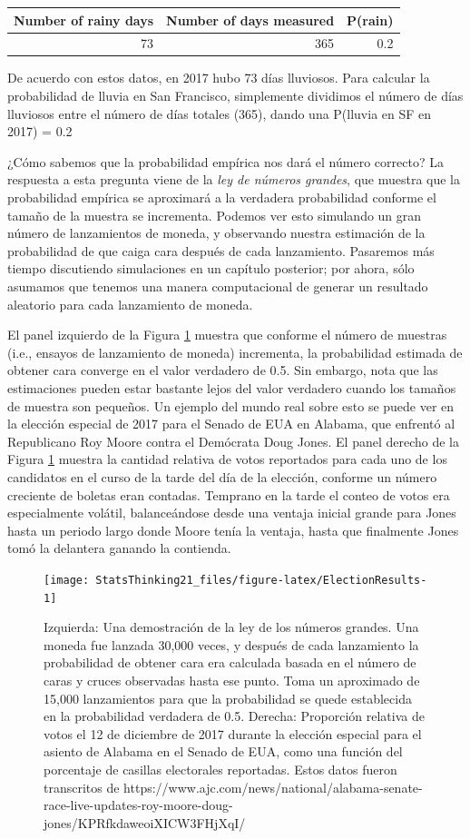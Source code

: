 \documentclass[
  12pt,
]{book}
\begin{document}
\begin{tabular}{r|r|r}
\hline
Number of rainy days & Number of days measured & P(rain)\\
\hline
73 & 365 & 0.2\\
\hline
\end{tabular}

De acuerdo con estos datos, en 2017 hubo 73 días lluviosos. Para calcular la probabilidad de lluvia en San Francisco, simplemente dividimos el número de días lluviosos entre el número de días totales (365), dando una P(lluvia en SF en 2017) = 0.2

¿Cómo sabemos que la probabilidad empírica nos dará el número correcto? La respuesta a esta pregunta viene de la \emph{ley de números grandes}, que muestra que la probabilidad empírica se aproximará a la verdadera probabilidad conforme el tamaño de la muestra se incrementa. Podemos ver esto simulando un gran número de lanzamientos de moneda, y observando nuestra estimación de la probabilidad de que caiga cara después de cada lanzamiento. Pasaremos más tiempo discutiendo simulaciones en un capítulo posterior; por ahora, sólo asumamos que tenemos una manera computacional de generar un resultado aleatorio para cada lanzamiento de moneda.

El panel izquierdo de la Figura \ref{fig:ElectionResults} muestra que conforme el número de muestras (i.e., ensayos de lanzamiento de moneda) incrementa, la probabilidad estimada de obtener cara converge en el valor verdadero de 0.5. Sin embargo, nota que las estimaciones pueden estar bastante lejos del valor verdadero cuando los tamaños de muestra son pequeños. Un ejemplo del mundo real sobre esto se puede ver en la elección especial de 2017 para el Senado de EUA en Alabama, que enfrentó al Republicano Roy Moore contra el Demócrata Doug Jones. El panel derecho de la Figura \ref{fig:ElectionResults} muestra la cantidad relativa de votos reportados para cada uno de los candidatos en el curso de la tarde del día de la elección, conforme un número creciente de boletas eran contadas. Temprano en la tarde el conteo de votos era especialmente volátil, balanceándose desde una ventaja inicial grande para Jones hasta un periodo largo donde Moore tenía la ventaja, hasta que finalmente Jones tomó la delantera ganando la contienda.

\begin{figure}
\texttt{[image: StatsThinking21\_files/figure-latex/ElectionResults-1]} \caption{Izquierda: Una demostración de la ley de los números grandes. Una moneda fue lanzada 30,000 veces, y después de cada lanzamiento la probabilidad de obtener cara era calculada basada en el número de caras y cruces observadas hasta ese punto. Toma un aproximado de 15,000 lanzamientos para que la probabilidad se quede establecida en la probabilidad verdadera de 0.5. Derecha: Proporción relativa de votos el 12 de diciembre de 2017 durante la elección especial para el asiento de Alabama en el Senado de EUA, como una función del porcentaje de casillas electorales reportadas. Estos datos fueron transcritos de https://www.ajc.com/news/national/alabama-senate-race-live-updates-roy-moore-doug-jones/KPRfkdaweoiXICW3FHjXqI/ }\label{fig:ElectionResults}
\end{figure}
\end{document}
